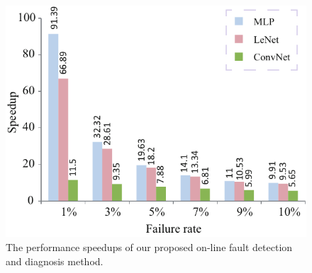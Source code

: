 \begin{figure}
    \centering
    \includegraphics[width=0.8\linewidth]{images/OL-fig14}
    \vspace{-10pt}
    \caption{The performance speedups of our proposed on-line fault detection and diagnosis method.}
    \label{fig:aetperformancecompare}
    \vspace{-15pt}
\end{figure}

